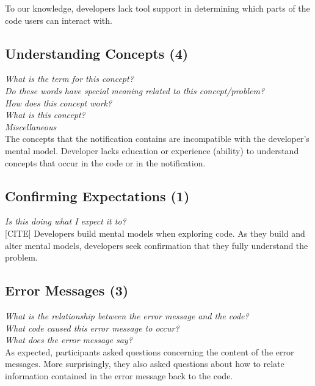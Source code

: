 \documentclass[conference]{IEEEtran}
\begin{document}
To our knowledge, developers lack tool support in determining which parts of the code users can interact with. 


\noindent\subsection{\textbf{Understanding Concepts (4)}}

\noindent\emph{What is the term for this concept?} \\
\emph{Do these words have special meaning related to this concept/problem?} \\
\emph{How does this concept work?} \\
\emph{What is this concept?} \\
\emph{Miscellaneous} \\

The concepts that the notification contains are incompatible with the developer's mental model. Developer lacks education or experience (ability) to understand concepts that occur in the code or in the notification. 


\noindent\subsection{\textbf{Confirming Expectations (1)}}

\noindent\emph{Is this doing what I expect it to?} \\

[CITE] Developers build mental models when exploring code. As they build and alter mental models, developers seek confirmation that they fully understand the problem.


\noindent\subsection{\textbf{Error Messages (3)}}

\noindent\emph{What is the relationship between the error message and the code?} \\
\emph{What code caused this error message to occur?} \\
\emph{What does the error message say?} \\

As expected, participants asked questions concerning the content of the error messages. 
More surprisingly, they also asked questions about how to relate information contained in the error message back to the code. 
\end{document}
